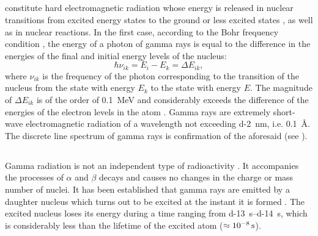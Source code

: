 \subsection{}\label{42.7.1}  constitute hard electromagnetic radiation whose energy is released in nuclear transitions from excited energy states to the ground or less excited states , as well as in nuclear reactions. In the first case, according to the Bohr frequency condition , the energy of a photon of gamma rays is equal to the difference in the energies of the
final and initial energy levels of the nucleus:
\begin{equation*}%
\hbar \nu_{ik} = E_{i} - E_{k} = \Delta E_{ik},
\end{equation*}
where $\nu_{ik}$ is the frequency of the photon corresponding to the transition of the nucleus from the state with energy $E_{k}$ to the state with energy $E$. The magnitude of $\Delta E_{ik}$ is of the order of \SI{0.1}{\mega\electronvolt} and considerably exceeds the difference of the energies of the electron levels in the atom . Gamma rays are extremely short-wave electromagnetic radiation of a wavelength not exceeding \SI{d-2}{\nano\meter}, i.e. \SI{0.1}{\angstrom}. The discrete line spectrum of gamma rays is confirmation of the aforesaid (see ).


\subsection{}\label{42.7.2} Gamma radiation is not an independent type of radioactivity . It accompanies the processes of $\alpha$ and $\beta$ decays and causes no changes in the charge or mass number of nuclei. It has been established that gamma rays are emitted by a daughter nucleus  which turns out to be excited at the instant it is formed . The excited nucleus loses its energy during a time ranging from \qtyrange{d-13}{d-14}{\second}, which is considerably less than the lifetime of the excited atom ($\approx \SI{d-8}{\second}$).


